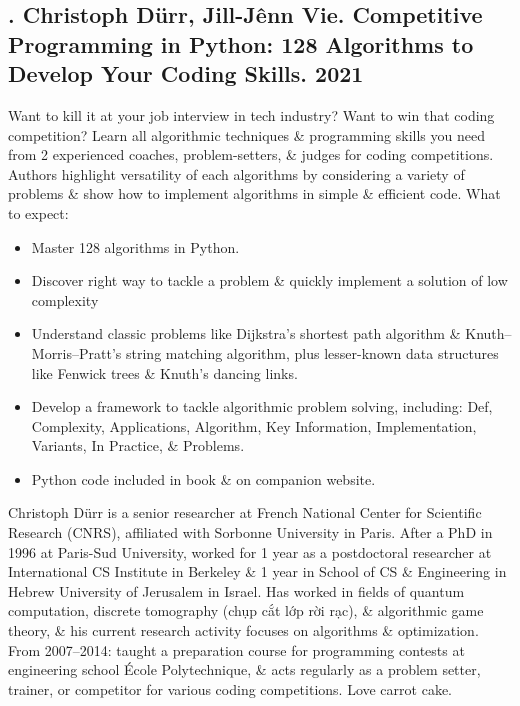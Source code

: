 \documentclass{article}
\begin{document}
\subsection{\cite{Durr_Vie2021}. {\sc Christoph D\"urr, Jill-J\^enn Vie}. Competitive Programming in Python: 128 Algorithms to Develop Your Coding Skills. 2021}
Want to kill it at your job interview in tech industry? Want to win that coding competition? Learn all algorithmic techniques \& programming skills you need from 2 experienced coaches, problem-setters, \& judges for coding competitions. Authors highlight versatility of each algorithms by considering a variety of problems \& show how to implement algorithms in simple \& efficient code. What to expect:
\begin{itemize}
	\item Master 128 algorithms in Python.
	\item Discover right way to tackle a problem \& quickly implement a solution of low complexity
	\item Understand classic problems like Dijkstra's shortest path algorithm \& Knuth--Morris--Pratt's string matching algorithm, plus lesser-known data structures like Fenwick trees \& Knuth's dancing links.
	\item Develop a framework to tackle algorithmic problem solving, including: Def, Complexity, Applications, Algorithm, Key Information, Implementation, Variants, In Practice, \& Problems.
	\item Python code included in book \& on companion website.
\end{itemize}
{\sc Christoph D\"urr} is a senior researcher at French National Center for Scientific Research (CNRS), affiliated with Sorbonne University in Paris. After a PhD in 1996 at Paris-Sud University, worked for 1 year as a postdoctoral researcher at International CS Institute in Berkeley \& 1 year in School of CS \& Engineering in Hebrew University of Jerusalem in Israel. Has worked in fields of quantum computation, discrete tomography (chụp cắt lớp rời rạc), \& algorithmic game theory, \& his current research activity focuses on algorithms \& optimization. From 2007--2014: taught a preparation course for programming contests at engineering school \'Ecole Polytechnique, \& acts regularly as a problem setter, trainer, or competitor for various coding competitions. Love carrot cake.
\end{document}
